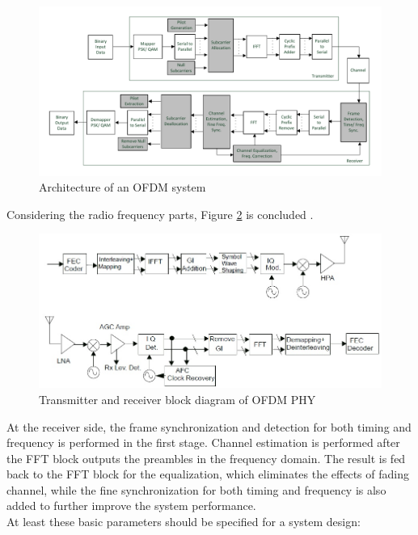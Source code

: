 \begin{figure}[h!]
\centering
\includegraphics[width=\textwidth]{content/fig/practical_bb_ofdm.pdf}
\caption{Architecture of an OFDM system}
\label{fig:arch_ofdm_sys}
\end{figure}

Considering the radio frequency parts, Figure \ref{fig:tx_rx_ofdm_phy} is concluded \cite{802_11}.\\
 
\begin{figure}[h!]
\centering
\includegraphics[width=12cm]{content/fig/tx_rx_ofdm_phy.jpg}
\caption{Transmitter and receiver block diagram of OFDM PHY}
\label{fig:tx_rx_ofdm_phy}
\end{figure}



At the receiver side, the frame synchronization and detection for both timing and frequency is performed in the first stage. Channel estimation is performed after the FFT block outputs the preambles in the frequency domain. The result is fed back to the FFT block for the equalization, which eliminates the effects of fading channel, while the fine synchronization for both timing and frequency is also added to further improve the system performance.\\
At least these basic parameters should be specified for a system design:

